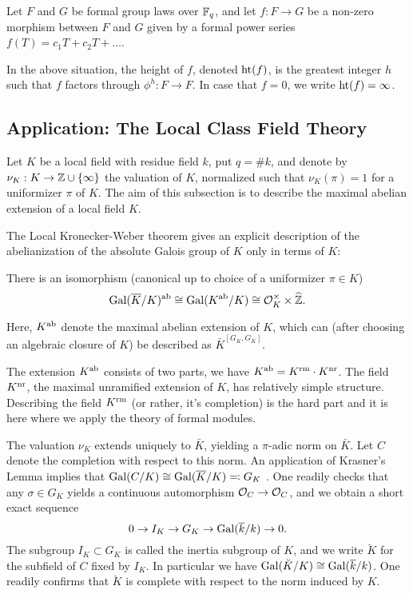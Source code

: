 \documentclass[../main.tex]{subfiles}
\begin{document}
Let $F$ and $G$ be formal group laws over $\mathbb{F}_q$, and let $f: F \to G$
be a non-zero morphism between $F$ and $G$ given by a formal power series $f(T) = c_1 T
+ c_2 T + \dots$.

\begin{defi}[Height]
  In the above situation, the height of $f$, denoted $\textnormal{ht}(f)$, is the
  greatest integer $h$ such that $f$ factors through $\phi^h: F \to F$. 
  In case that $f = 0$, we write $\textnormal{ht}(f) = \infty$. 
\end{defi}


\subsection{Application: The Local Class Field Theory} %
\label{sub:Application: The Local Class Field Theory}

Let $K$ be a local field with residue field $k$, put $q = \# k$, and 
denote by $\nu_K: K \to \mathbb{Z} \cup \{\infty\}$ the valuation of $K$, normalized
such that $\nu_K(\pi) = 1$ for a uniformizer $\pi$ of $K$.
The aim of this subsection is to describe the maximal abelian extension of
a local field $K$.

The Local Kronecker-Weber theorem gives an explicit description of the
abelianization of the absolute Galois group of $K$ only in terms of $K$:

\begin{thm}\label{thm:localKW}
  There is an isomorphism (canonical up to choice of a uniformizer 
  $\pi \in K$)
  \begin{equation*}
    \operatorname{Gal}(\overline K/K)^{\mathrm{ab}} \cong \operatorname{Gal}(K^{\mathrm{ab}}/K) \cong \mathcal{O}_K^\times
    \times \widehat {\mathbb{Z}}.
  \end{equation*}
\end{thm}
Here, $K^{\mathrm{ab}}$ denote the maximal abelian extension of $K$, which can (after choosing
an algebraic closure of $K$) be described as $\bar K^{[G_K, G_K]}$. 

The extension $K^{\mathrm{ab}}$ consists of two parts, we have 
$K^{\mathrm{ab}} = K^{\mathrm{rm}} \cdot K^{\mathrm{nr}}$. The field $K^{\mathrm{nr}}$, the maximal unramified extension
of $K$, has relatively simple structure. 
Describing the field $K^{\mathrm{rm}}$ (or rather, it's completion) is the hard part and
it is here where we apply the theory of formal modules.

The valuation $\nu_K$ extends uniquely to $\bar K$, yielding a
$\pi$-adic norm on $\bar K$. Let $C$ denote the completion with respect to this
norm. An application of Krasner's Lemma implies that $\operatorname{Gal}(C/K) \cong \operatorname{Gal}(\overline
K/K) \eqqcolon G_K$
. One readily checks that any $\sigma \in G_K$ yields a 
continuous automorphism $\mathcal{O}_C \to \mathcal{O}_C$, and we obtain a short exact sequence 
\begin{equation*}
  0 \to I_K \to G_K \to \operatorname{Gal}(\overline k /k) \to 0.
\end{equation*}
The subgroup $I_K \subset G_K$ is called the inertia subgroup of $K$,
and we write $\breve K$ for the subfield of $C$ fixed by $I_K$. In particular
we have $\operatorname{Gal}(\breve K /K) \cong \operatorname{Gal}(\overline k /k)$. One readily confirms that 
$\breve K$ is complete with respect to the norm induced by $K$. 
\end{document}
